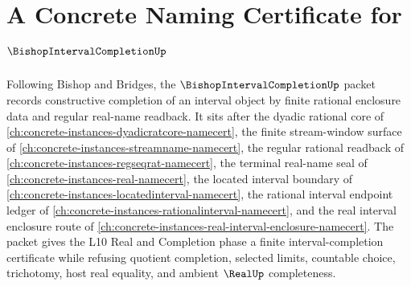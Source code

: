 \chapter{A Concrete Naming Certificate for $\BishopIntervalCompletionUp$}
\label{ch:concrete-instances-bishop-interval-completion-namecert}

Following Bishop and Bridges, the $\BishopIntervalCompletionUp$ packet records constructive completion of an interval object by finite rational enclosure data and regular real-name readback. It sits after the dyadic rational core of \autoref{ch:concrete-instances-dyadicratcore-namecert}, the finite stream-window surface of \autoref{ch:concrete-instances-streamname-namecert}, the regular rational readback of \autoref{ch:concrete-instances-regseqrat-namecert}, the terminal real-name seal of \autoref{ch:concrete-instances-real-namecert}, the located interval boundary of \autoref{ch:concrete-instances-locatedinterval-namecert}, the rational interval endpoint ledger of \autoref{ch:concrete-instances-rationalinterval-namecert}, and the real interval enclosure route of \autoref{ch:concrete-instances-real-interval-enclosure-namecert}. The packet gives the L10 Real and Completion phase a finite interval-completion certificate while refusing quotient completion, selected limits, countable choice, trichotomy, host real equality, and ambient $\RealUp$ completeness.

